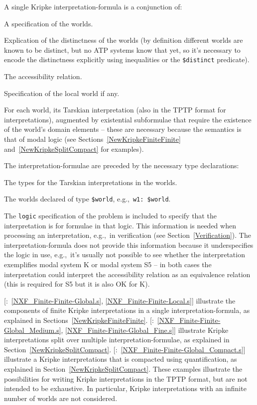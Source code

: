 \documentclass{ceurart}
\newcommand{\smalltt}[1]{\small \texttt{#1}}
\newcommand{\example}{{\scriptsize \faFile[regular]}}
\newenvironment{packed_itemize}{
\vspace*{-0.3em}
\begin{itemize}
\setlength{\partopsep}{0pt}
\setlength{\itemsep}{1pt}
\setlength{\parskip}{0pt}
\setlength{\parsep}{0pt}
}{\end{itemize}}
\begin{document}
A single Kripke interpretation-formula is a conjunction of:
\begin{packed_itemize}
\item A specification of the worlds.
\item Explication of the distinctness of the worlds (by definition different worlds are known to
      be distinct, but no ATP systems know that yet, so it's necessary to encode the
      distinctness explicitly using inequalities or the \smalltt{\$distinct} predicate).
\item The accessibility relation.
\item Specification of the local world if any.
\item For each world, its Tarskian interpretation (also in the TPTP format for interpretations),
      augmented by existential subformulae that require the existence of the world's domain 
      elements -- these are necessary because the semantics is that of modal logic (see
      Sections~\ref{NewKripkeFiniteFinite} and~\ref{NewKripkeSplitCompact} for examples).
\end{packed_itemize}
The interpretation-formulae are preceded by the necessary type declarations:
\begin{packed_itemize}
\item The types for the Tarskian interpretations in the worlds.
\item The worlds declared of type \smalltt{\$world}, e.g.,~\smalltt{w1: \$world}.
\end{packed_itemize}

The \smalltt{logic} specification of the problem is included to specify that the interpretation is
for formulae in that logic.
This information is needed when processing an interpretation, e.g.,~in verification (see 
Section~\ref{Verification}). 
The interpretation-formula does not provide this information because it underspecifies the 
logic in use, e.g.,~it's usually not possible to see whether the interpretation exemplifies modal 
system K or modal system S5 -- in both cases the interpretation could interpret the accessibility 
relation as an equivalence relation (this is required for S5 but it is also OK for K).

[\example{}:~\ref{NXF_Finite-Finite-Global.s}, \ref{NXF_Finite-Finite-Local.s}] illustrate the 
components of finite Kripke interpretations in a single interpretation-formula, as explained in 
Sections~\ref{NewKripkeFiniteFinite}.
[\example{}:~\ref{NXF_Finite-Finite-Global_Medium.s},
\ref{NXF_Finite-Finite-Global_Fine.s}] illustrate Kripke interpretations split 
over multiple interpretation-formulae, as explained in Section~\ref{NewKripkeSplitCompact}.
[\example{}:~\ref{NXF_Finite-Finite-Global_Compact.s}] illustrate
a Kripke interpretations that is compacted using quantification, as explained in 
Section~\ref{NewKripkeSplitCompact}.
These examples illustrate the possibilities for writing Kripke interpretations in the TPTP format,
but are not intended to be exhaustive.
In particular, Kripke interpretations with an infinite number of worlds are not considered.
\end{document}
